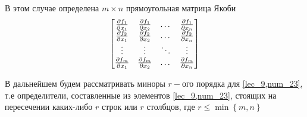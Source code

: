 \documentclass[../../main.tex]{subfiles}
\begin{document}
В этом случае определена $m\times n$ 
прямоугольная матрица Якоби
\begin{equation}
 \label{lec_9,num_23}
 \begin{bmatrix}
        \frac{\partial f_1}{\partial x_1} 
        & \frac{\partial f_1}{\partial x_2} & \dots & 
        \frac{\partial f_1}{\partial x_n} \\
        \frac{\partial f_2}{\partial x_1} & \frac{\partial f_2}{\partial x_2} &\dots & 
        \frac{\partial f_2}{\partial x_n} \\
        \vdots & \vdots & \ddots & \vdots \\
        \frac{\partial f_m}{\partial x_1} & \frac{\partial f_m}{\partial x_2} & \dots & 
        \frac{\partial f_m}{\partial x_n} 
    \end{bmatrix}
\end{equation}

В дальнейшем будем рассматривать миноры $r-$ого порядка
для \eqref{lec_9,num_23}, т.е определители, 
составленные из элементов \eqref{lec_9,num_23}, 
стоящих на пересечении каких-либо $r$ строк или 
$r$ столбцов, где 
$r \leq \min\left\{ m, n\right\}$
\end{document}

